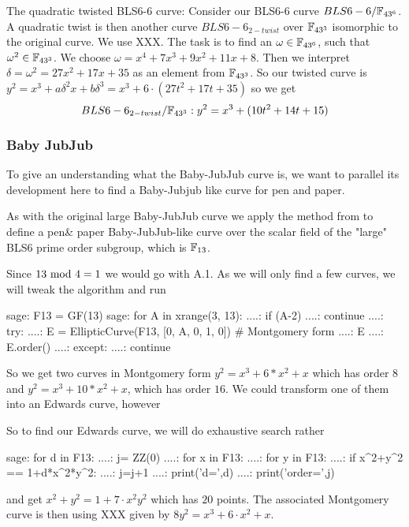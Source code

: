The quadratic twisted BLS6-6 curve: Consider our BLS6-6 curve $BLS6-6/\mathbb{F}_{43^6}$. A quadratic twist is then another curve $BLS6-6_{2-twist}$ over $\mathbb{F}_{43^3}$ isomorphic to the original curve. We use XXX. The task is to find an $\omega\in \mathbb{F}_{43^6}$, such that $\omega^2 \in \mathbb{F}_{43^3}$. 
We choose $\omega = x^4 + 7x^3 + 9x^2 + 11x + 8$. Then we interpret $\delta = \omega^2 = 27x^2 + 17x + 35$ as an element from $\mathbb{F}_{43^3}$. So our twisted curve is
$y^2 = x^3+a\delta^2 x+b \delta^3 = x^3+6\cdot(27t^2+17t+35)$
so we get
$$
BLS6-6_{2-twist}/\mathbb{F}_{43^3}: y^2 = x^3+(10t^2+14t+15)
$$
\subsubsection{Baby JubJub}
To give an understanding what the Baby-JubJub curve is, we want to parallel its development here to find a Baby-Jubjub like curve for pen and paper.

As with the original large Baby-JubJub curve we apply the method from
to define a pen\& paper Baby-JubJub-like curve over the scalar field of the "large" BLS6 prime order subgroup, which is $\mathbb{F}_{13}$. 

Since $13 \text{ mod } 4=1$ we would go with A.1. As we will only find a few curves, we will tweak the algorithm and run
\begin{sagecommandline}
sage: F13 = GF(13) 
sage: for A in xrange(3, 13):
....:     if (A-2) %
....:         continue
....:     try:
....:         E = EllipticCurve(F13, [0, A, 0, 1, 0]) # Montgomery form
....:         E
....:         E.order()
....:     except:               
....:         continue      
\end{sagecommandline}
So we get two curves in Montgomery form $y^2 = x^3 + 6*x^2 + x$ which has order $8$ and  $y^2 = x^3 + 10*x^2 + x$, which has order $16$. We could transform one of them into an Edwards curve, however   

So to find our Edwards curve, we will do exhaustive search rather 
\begin{sagecommandline}
sage: for d in F13:          
....:     j= ZZ(0)          
....:     for x in F13:
....:         for y in F13:                        
....:             if x^2+y^2 == 1+d*x^2*y^2:                           
....:                 j=j+1        
....:     print('d=',d)                
....:     print('order=',j)     
\end{sagecommandline}
and get $x^2+y^2= 1+7\cdot x^2y^2$ which has $20$ points. The associated Montgomery curve is then using XXX given by $8y^2 = x^3 + 6\cdot x^2 + x$.

